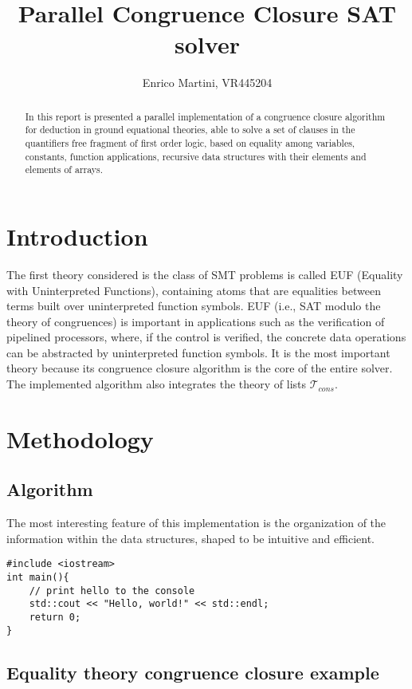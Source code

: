 \documentclass{IEEEtran}
\begin{document}
\title{Parallel Congruence Closure SAT solver}
\author{Enrico Martini, VR445204}
\maketitle
\begin{abstract}
 In this report is presented a parallel implementation of a congruence closure algorithm for deduction in ground equational theories, able to solve a set of clauses in the quantifiers free fragment of first order logic, based on equality among variables, constants, function applications, recursive data structures with their elements and elements of arrays.
\end{abstract}
\section{Introduction}
The first theory considered is the class of SMT problems is called EUF (Equality with Uninterpreted Functions), containing atoms that are equalities between terms built over uninterpreted function symbols. EUF (i.e., SAT modulo the theory of congruences) is important in applications such as the verification of pipelined processors, where, if the control is verified, the concrete data operations can be abstracted by uninterpreted function symbols.\cite{NIEUWENHUIS2007557} It is the most important theory because its congruence closure algorithm is the core of the entire solver. The implemented algorithm also integrates the theory of lists $\mathcal{T}_{cons}$.
\section{Methodology}


\subsection{Algorithm}
The most interesting feature of this implementation is the organization of the information within the data structures, shaped to be intuitive and efficient.
\begin{lstlisting}[style=cpp]
#include <iostream>
int main(){
	// print hello to the console
	std::cout << "Hello, world!" << std::endl;
	return 0;
}
\end{lstlisting}

\subsection{Equality theory congruence closure example}
\end{document}
